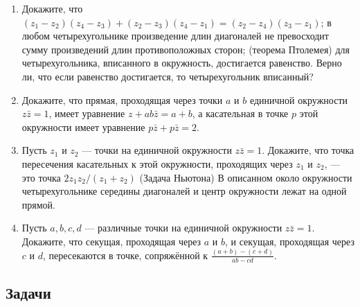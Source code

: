 \begin{enumerate}
\item Докажите, что \ipunkt $(z_1 - z_2)(z_4 - z_3) + (z_2 - z_3)(z_4 - z_1) = (z_2 - z_4)(z_3 - z_1)$;
\ipunkt в любом четырехугольнике произведение длин диагоналей не превосходит сумму произведений длин
противоположных сторон; \ipunkt (теорема Птолемея) для четырехугольника, вписанного в окружность, достигается
равенство. \ipunkt Верно ли, что если равенство достигается, то четырехугольник вписанный?
\item Докажите, что прямая, проходящая через точки $a$ и $b$ единичной окружности $z\bar z = 1$, имеет 
уравнение $z + ab\bar z = a + b$, а касательная в точке $p$ этой окружности имеет уравнение $p\bar z + p\bar z = 2$.
\item \ipunkt Пусть $z_1$ и $z_2$ --- точки на единичной окружности $z\bar z = 1$. Докажите, что точка пересечения касательных к этой окружности, проходящих через $z_1$ и $z_2$, --- это точка $2z_1z_2/(z_1+z_2)$
\ipunkt (Задача Ньютона) В описанном
около окружности четырехугольнике середины диагоналей и центр окружности лежат на одной прямой.
\item \ipunkt Пусть $a, b, c, d$ --- различные точки на единичной окружности $z\bar z = 1$. Докажите, что секущая,
проходящая через $a$ и $b$, и секущая, проходящая через $c$ и $d$, пересекаются в точке, сопряжённой к
$\frac{(a+b)-(c+d)}{ab-cd}$.
\end{enumerate}

\subsection*{Задачи}

